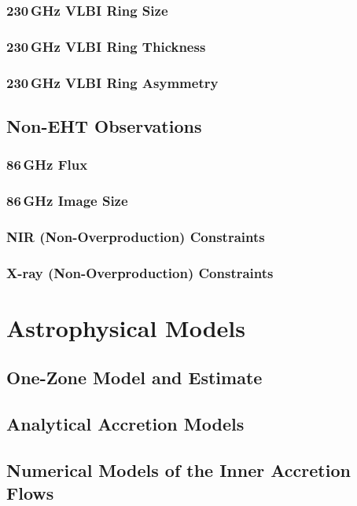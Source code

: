 \documentclass[twocolumn,twocolappendix,tighten,dvipsnames,linenumbers]{aastex63}
\begin{document}
\subsubsection{230\,GHz VLBI Ring Size}
\subsubsection{230\,GHz VLBI Ring Thickness}
\subsubsection{230\,GHz VLBI Ring Asymmetry}

\subsection{Non-EHT Observations}
\subsubsection{86\,GHz Flux}
\subsubsection{86\,GHz Image Size}
\subsubsection{NIR (Non-Overproduction) Constraints}
\subsubsection{X-ray (Non-Overproduction) Constraints}

\section{Astrophysical Models}

\subsection{One-Zone Model and Estimate}

\subsection{Analytical Accretion Models}

\subsection{Numerical Models of the Inner Accretion Flows}
\end{document}
